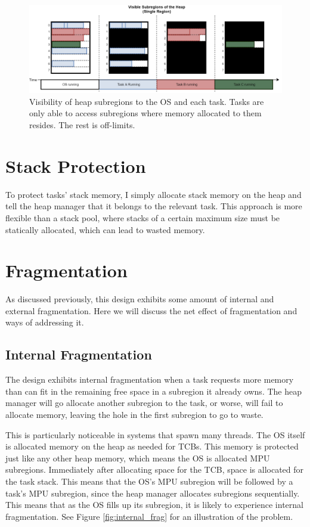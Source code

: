 \begin{figure}[hbtp]
	\centering
	\includegraphics[width=\linewidth]{figs/heap_over_time.png}
	\caption{Visibility of heap subregions to the OS and each task. Tasks are only able to access subregions where memory allocated to them resides. The rest is off-limits.}
	\label{fig:heap_over_time}
\end{figure}

\section{Stack Protection}

To protect tasks' stack memory, I simply allocate stack memory on the heap and tell the heap manager that it belongs to the relevant task. This approach is more flexible than a stack pool, where stacks of a certain maximum size must be statically allocated, which can lead to wasted memory.

\section{Fragmentation}

As discussed previously, this design exhibits some amount of internal and external fragmentation.
Here we will discuss the net effect of fragmentation and ways of addressing it.

\subsection{Internal Fragmentation}

The design exhibits internal fragmentation when a task requests more memory than can fit in the remaining free space in a subregion it already owns. The heap manager will go allocate another subregion to the task, or worse, will fail to allocate memory, leaving the hole in the first subregion to go to waste.

This is particularly noticeable in systems that spawn many threads. The OS itself is allocated memory on the heap as needed for TCBs. This memory is protected just like any other heap memory, which means the OS is allocated MPU subregions. Immediately after allocating space for the TCB, space is allocated for the task stack. This means that the OS's MPU subregion will be followed by a task's MPU subregion, since the heap manager allocates subregions sequentially. This means that as the OS fills up its subregion, it is likely to experience internal fragmentation. See Figure \ref{fig:internal_frag} for an illustration of the problem.

